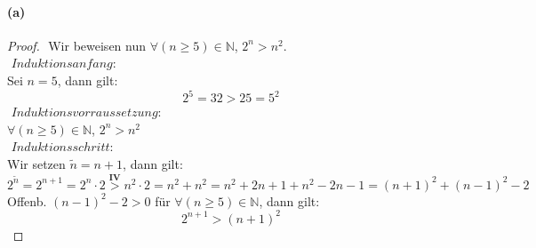 \paragraph{(a)}
\begin{proof}
$ $\newline
Wir beweisen nun $\forall(n\geq 5)\in\mathbb{N}$, $2^n>n^2$.\\
$ $\newline
$Induktionsanfang:$\\
Sei $n=5$, dann gilt:
\begin{equation*}
2^5=32>25=5^2
\end{equation*}
$ $\newline
$Induktionsvorraussetzung:$\\
$\forall(n\geq 5)\in\mathbb{N}$, $2^n>n^2$\\
$ $\newline
$Induktionsschritt:$\\
Wir setzen $\tilde{n}=n+1$, dann gilt:
\begin{equation*}
2^{\tilde{n}}=2^{n+1}=2^n\cdot 2\overset{\mathbf{IV}}{>} n^2\cdot 2=n^2+n^2=n^2+2n+1+n^2-2n-1=(n+1)^2+(n-1)^2-2
\end{equation*}
Offenb. $(n-1)^2-2>0$ für $\forall(n\geq 5)\in\mathbb{N}$, dann gilt:
\begin{equation*}
2^{n+1}>(n+1)^2
\end{equation*}
\end{proof}

